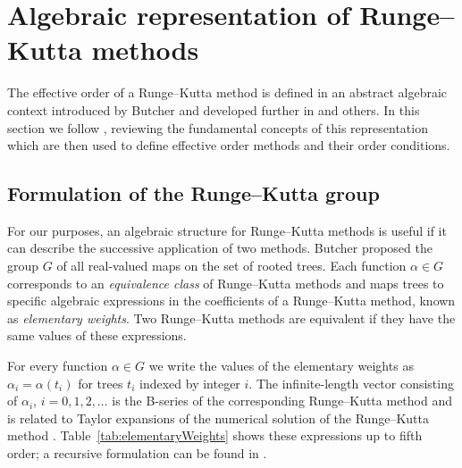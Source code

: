 \section{Algebraic representation of Runge--Kutta methods}\label{sec:Algebraic_RK}

The effective order of a Runge--Kutta method is defined in an abstract algebraic
context introduced by Butcher \cite{Butcher1969} and developed further in
\cite{Butcher1972, Hairer1974, Butcher1996, Butcher1998} and others.
In this section we follow \cite{Butcher2008_book}, reviewing the fundamental
concepts of this representation which are then used to define
effective order methods and their order conditions.


\subsection{Formulation of the Runge--Kutta group}\label{sec:RK_group}


For our purposes, an algebraic structure for Runge--Kutta methods is useful if it can describe
the successive application of two methods.
Butcher \cite{Butcher1972} proposed the group $G$ of all real-valued maps on the
set of rooted trees.
Each function $\alpha \in G$ corresponds
to an \emph{equivalence class} of Runge--Kutta methods and maps trees to specific
algebraic expressions in the coefficients
of a Runge--Kutta method, known as \emph{elementary weights}.
Two Runge--Kutta methods are equivalent if they have the same values of these expressions.


For every function $\alpha \in G$ we write the values of the
elementary weights as $\alpha_{i} = \alpha(t_{i})$ for trees $t_{i}$
indexed by integer $i$.
The infinite-length vector consisting of $\alpha_i$, $i = 0, 1, 2,\ldots$ is the B-series
of the corresponding Runge--Kutta method and is related to Taylor expansions of the numerical solution of the Runge--Kutta method \cite{Hairer1974, Butcher2008_book}.
Table~\ref{tab:elementaryWeights} shows these expressions up to fifth order; a recursive formulation can be found in \cite[Definition 312]{Butcher2008_book}.

